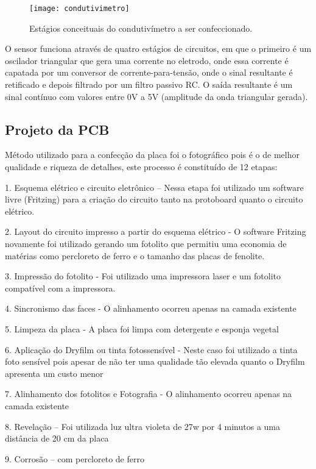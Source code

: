 \begin{figure}[!h]
\centering \texttt{[image: condutivimetro]}
\caption{Estágios conceituais do condutivímetro a ser confeccionado.}
\label{estagcondu}
\end{figure}

O sensor funciona através de quatro estágios de circuitos, em que o primeiro é um oscilador triangular que gera uma corrente no eletrodo, onde essa corrente é capatada por um conversor de corrente-para-tensão, onde o sinal resultante é retificado e depois filtrado por um filtro passivo RC. O saída resultante é um sinal contínuo com valores entre 0V a 5V (amplitude da onda triangular gerada).


\subsection{Projeto da PCB}

Método utilizado para a confecção da placa foi o fotográfico pois é o de melhor qualidade e riqueza de detalhes, este processo é constituído de 12 etapas:

1. Esquema elétrico e circuito eletrônico – Nessa etapa foi utilizado um software livre (Fritzing) para a criação do circuito tanto na protoboard quanto o circuito elétrico.


2. Layout do circuito impresso a partir do esquema elétrico -  O software Fritzing novamente foi utilizado gerando um fotolito que permitiu uma economia de matérias como percloreto de ferro e o tamanho das placas de fenolite.

3. Impressão do fotolito -  Foi utilizado uma impressora laser e um fotolito compatível com a impressora.

4. Sincronismo das faces - O alinhamento ocorreu apenas na camada existente

5. Limpeza da placa - A placa foi limpa com detergente e esponja vegetal

6. Aplicação do Dryfilm ou tinta fotossensível -  Neste caso foi utilizado a tinta foto sensível pois apesar de não ter uma qualidade tão elevada quanto o Dryfilm apresenta um custo menor

7. Alinhamento dos fotolitos e Fotografia - O alinhamento ocorreu apenas na camada existente

8. Revelação – Foi utilizada luz ultra violeta de 27w por 4 minutos a uma distância de 20 cm da placa

9. Corrosão – com percloreto de ferro

